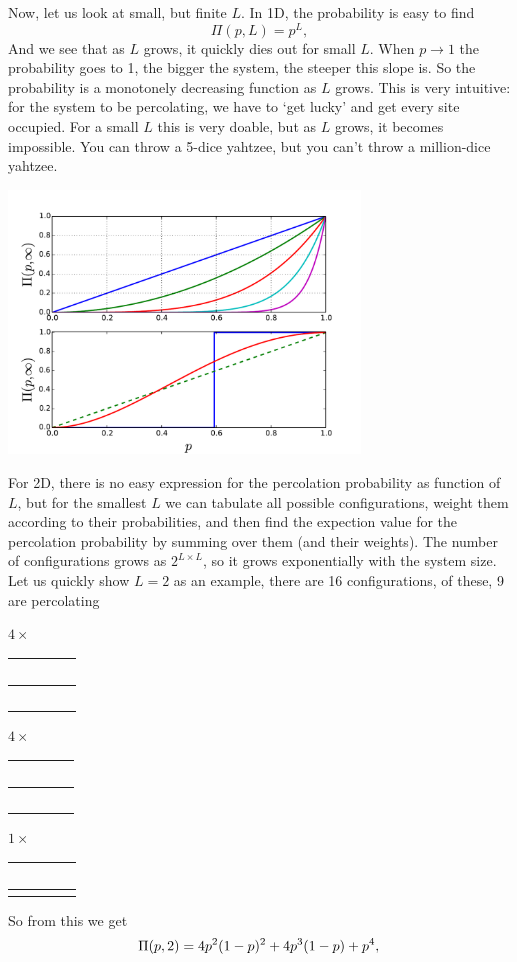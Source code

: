 \documentclass[a4paper, 11pt, notitlepage, english]{article}
\begin{document}
Now, let us look at small, but finite $L$. In 1D, the probability is easy to find
$$\Pi(p,L) = p^L,$$
And we see that as $L$ grows, it quickly dies out for small $L$. When $p \to 1$ the probability goes to 1, the bigger the system, the steeper this slope is. So the probability is a monotonely decreasing function as $L$ grows. This is very intuitive: for the system to be percolating, we have to `get lucky' and get every site occupied. For a small $L$ this is very doable, but as $L$ grows, it becomes impossible. You can throw a 5-dice yahtzee, but you can't throw a million-dice yahtzee.

\begin{center}
	\includegraphics[width=0.7\textwidth]{15b.pdf}
\end{center}

For 2D, there is no easy expression for the percolation probability as function of $L$, but for the smallest $L$ we can tabulate all possible configurations, weight them according to their probabilities, and then find the expection value for the percolation probability by summing over them (and their weights). The number of configurations grows as $2^{L\times L}$, so it grows exponentially with the system size. Let us quickly show $L=2$ as an example, there are 16 configurations, of these, 9 are percolating

\begin{center}
$4\times$
\begin{tabular}{|c|c|}
  \hline
  \ \ \cellcolor{black}&  \ \ \  \\ \hline
  \ \ \cellcolor{black} & \qquad \\
  \hline
\end{tabular} \qquad
\qquad $4\times$
\begin{tabular}{|c|c|}
  \hline
  \  \cellcolor{black} & \cellcolor{black} \ \ \  \\ \hline
  \ \  \cellcolor{black} & \qquad \\
  \hline
\end{tabular} \qquad 
\qquad $1\times$
\begin{tabular}{|c|c|}
  \hline
  \ \ \cellcolor{black} & \cellcolor{black} \ \ \  \\ \hline
  \cellcolor{black} & \cellcolor{black} \qquad \\
  \hline
\end{tabular}	
\end{center}
So from this we get
$$\Pi(p, 2) = 4p^2(1-p)^2 + 4p^3(1-p) + p^4, \\$$
\end{document}
